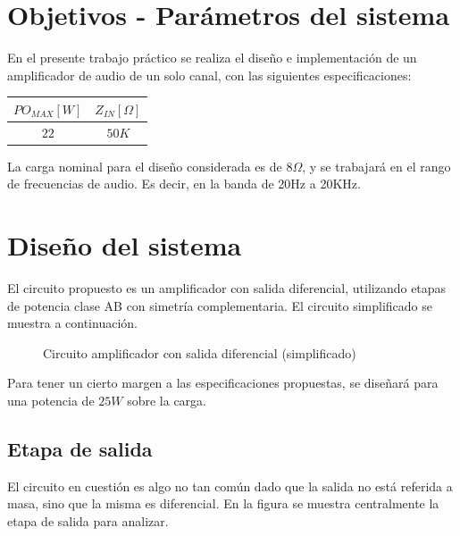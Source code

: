 



\tableofcontents
\newpage

\section{Objetivos - Parámetros del sistema}

En el presente trabajo práctico se realiza el diseño e implementación de un amplificador de audio de un solo canal, con las siguientes especificaciones:

\begin{center}
\begin{tabular}{|c|c|}
\hline 
$PO_{MAX}[W]$ & $Z_{IN}[\Omega]$\\
\hline 
\hline 
$22$ & $50K$\\
\hline 
\end{tabular}
\end{center}

La carga nominal para el diseño considerada es de $8\Omega$, y se trabajará en el rango de frecuencias de audio. Es decir, en la banda de 20Hz a 20KHz.

\section{Diseño del sistema}

El circuito propuesto es un amplificador con salida diferencial, utilizando etapas de potencia clase AB con simetría complementaria. El circuito simplificado se muestra a continuación.

\begin{figure}[!ht]
\begin{centering}
\par\end{centering}
\caption{Circuito amplificador con salida diferencial (simplificado)}
\end{figure}

Para tener un cierto margen a las especificaciones propuestas, se diseñará para una potencia de $25W$ sobre la carga.

\subsection{Etapa de salida}

El circuito en cuestión es algo no tan común dado que la salida no está referida a masa, sino que la misma es diferencial. En la figura se muestra centralmente la etapa de salida para analizar.


